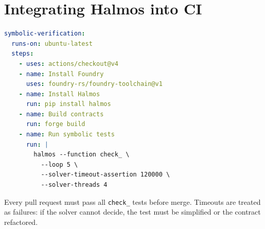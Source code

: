 \section{Integrating Halmos into CI}


\begin{lstlisting}[language=YAML,caption={CI configuration for Halmos symbolic tests}]
symbolic-verification:
  runs-on: ubuntu-latest
  steps:
    - uses: actions/checkout@v4
    - name: Install Foundry
      uses: foundry-rs/foundry-toolchain@v1
    - name: Install Halmos
      run: pip install halmos
    - name: Build contracts
      run: forge build
    - name: Run symbolic tests
      run: |
        halmos --function check_ \
          --loop 5 \
          --solver-timeout-assertion 120000 \
          --solver-threads 4
\end{lstlisting}

Every pull request must pass all \texttt{check\_} tests before merge. Timeouts are
treated as failures: if the solver cannot decide, the test must be simplified or the
contract refactored.

